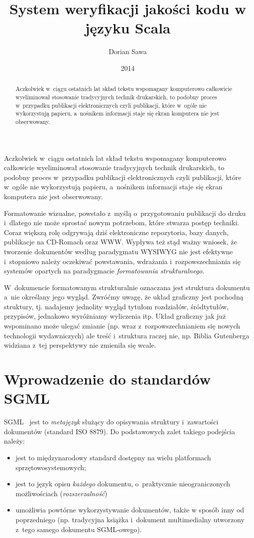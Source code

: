 \documentclass[brudnopis]{xmgr}
\author   {Dorian Sawa}
\title    {System weryfikacji jakości kodu w języku Scala}
\date     {2014}
\begin{document}
\begin{abstract}
  Aczkolwiek w~ciągu ostatnich lat skład tekstu wspomagany komputerowo
  całkowicie wyeliminował stosowanie tradycyjnych technik drukarskich,
  to podobny proces w~przypadku publikacji elektronicznych czyli
  publikacji, które w~ogóle nie wykorzystują papieru, a~nośnikem
  informacji staje się ekran komputera nie jest obserwowany.
\end{abstract}

\maketitle
%
\introduction

Aczkolwiek w~ciągu ostatnich lat skład tekstu wspomagany
komputerowo całkowicie wyeliminował stosowanie tradycyjnych technik
drukarskich, to podobny proces w~przypadku publikacji elektronicznych
czyli publikacji, które w~ogóle nie wykorzystują papieru, a~nośnikem
informacji staje się ekran komputera nie jest obserwowany.

Formatowanie wizualne, powstało z~myślą o~przygotowaniu publikacji do
druku i~dlatego nie może sprostać nowym potrzebom, które stwarza
postęp techniki. Coraz większą rolę odgrywają dziś elektroniczne
repozytoria, bazy danych, publikacje na CD-Romach oraz WWW.  Wypływa
też stąd ważny wniosek, że tworzenie dokumentów według paradygmatu
WYSIWYG nie jest efektywne i~stopniowo należy oczekiwać powstawania,
wdrażania i~rozpowszechniania się systemów opartych na paradygmacie
\emph{formatowania strukturalnego}.

W~dokumencie formatowanym strukturalnie oznaczana jest struktura
dokumentu a~nie określany jego wygląd. Zwróćmy uwagę, że układ
graficzny jest pochodną struktury, tj. nadajemy jednolity wygląd
tytułom rozdziałów, śródtytułów, przypisów, jednakowo wyróżniamy
wyliczenia itp.  Układ graficzny jak już wspominano może ulegać zmianie
(np. wraz z~rozpowszechnianiem się nowych technologii wydawniczych)
ale treść i~struktura raczej nie, np. Biblia Gutenberga widziana z~tej
perspektywy nie zmieniła się wcale.

\chapter{Wprowadzenie do standardów SGML}

SGML~\cite{Goldfarb:2002:CFG} jest to \emph{metajęzyk} służący do opisywania
struktury i~zawartości dokumentów (standard ISO 8879).  Do
podstawowych zalet takiego podejścia należy: 
\begin{itemize}
\item
jest to międzynarodowy
standard dostępny na wielu platformach sprzętowo\-systemowych;
\item
jest to
język opisu \emph{każdego\/} dokumentu, o~praktycznie nieograniczonych
możliwościach (\emph{rozszerzalność\/}) 
\item
umożliwia powtórne
wykorzystywanie dokumentów, także w sposób inny od poprzedniego
(np. tradycyjna książka i~dokument multimedialny utworzony z~tego
samego dokumentu SGML-owego).
\end{itemize}
\end{document}
